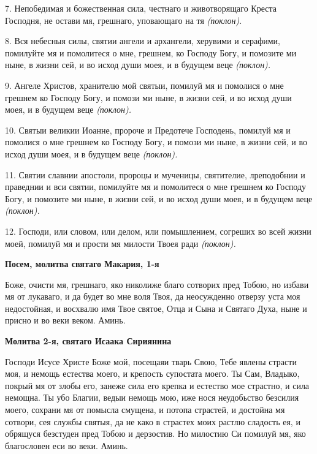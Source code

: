 7. Непобедимая и божественная сила, честнаго и животворящаго Креста Господня, не остави мя, грешнаго, уповающаго на тя \itshape (поклон)\normalfont{}.


8. Вся небесныя силы, святии ангели и архангели, херувими и серафими, помилуйте мя и помолитеся о мне, грешнем, ко Господу Богу, и помозите ми ныне, в жизни сей, и во исход души моея, и в будущем веце \itshape (поклон)\normalfont{}.


9. Ангеле Христов, хранителю мой святыи, помилуй мя и помолися о мне грешнем ко Господу Богу, и помози ми ныне, в жизни сей, и во исход души моея, и в будущем веце \itshape (поклон)\normalfont{}.


10. Святыи великии Иоанне, пророче и Предотече Господень, помилуй мя и помолися о мне грешнем ко Господу Богу, и помози ми ныне, в жизни сей, и во исход души моея, и в будущем веце \itshape (поклон)\normalfont{}.


11. Святии славнии апостоли, пророцы и мученицы, святителие, лреподобнии и праведнии и вси святии, помилуйте мя и помолитеся о мне грешнем ко Господу Богу, и помозите ми ныне, в жизни сей, и во исход души моея, и в будущем веце \itshape (поклон)\normalfont{}.


12. Господи, или словом, или делом, или помышлением, согреших во всей жизни моей, помилуй мя и прости мя милости Твоея ради \itshape (поклон)\normalfont{}.






\bfseries Посем, молитва святаго Макария, 1-я\normalfont{}


Боже, очисти мя, грешнаго, яко николиже благо сотворих пред Тобою, но избави мя от лукаваго, и да будет во мне воля Твоя, да неосужденно отверзу уста моя недостойная, и восхвалю имя Твое святое, Отца и Сына и Святаго Духа, ныне и присно и во веки веком. Аминь.





\bfseries Молитва 2-я, святаго Исаака Сириянина\normalfont{}


Господи Исусе Христе Боже мой, посещаяи тварь Свою, Тебе явлены страсти моя, и немощь естества моего, и крепость супостата моего. Ты Сам, Владыко, покрый мя от злобы его, занеже сила его крепка и естество мое страстно, и сила немощна. Ты убо Благии, ведыи немощь мою, иже нося неудобьство безсилия моего, сохрани мя от помысла смущена, и потопа страстей, и достойна мя сотвори, сея службы святыя, да не како в страстех моих растлю сладость ея, и обрящуся безстуден пред Тобою и дерзостив. Но милостию Си помилуй мя, яко благословен еси во веки. Аминь.





